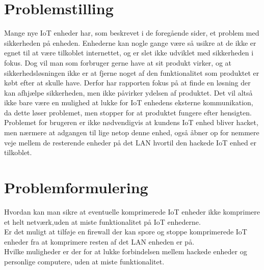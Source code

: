 \section{Problemstilling}


Mange nye IoT enheder har, som beskrevet i de foregående sider, et problem med sikkerheden på enheden. Enhederne kan nogle gange være så usikre at de ikke er egnet til at være tilkoblet internettet, og er slet ikke udviklet med sikkerheden i fokus. Dog vil man som forbruger gerne have at sit produkt virker, og at sikkerhedsløsningen ikke er at fjerne noget af den funktionalitet som produktet er købt efter at skulle have. Derfor har rapporten fokus på at finde en løsning der kan afhjælpe sikkerheden, men ikke påvirker ydelsen af produktet. Det vil altså ikke bare være en mulighed at lukke for IoT enhedens eksterne kommunikation, da dette løser problemet, men stopper for at produktet fungere efter hensigten.\\
Problemet for brugeren er ikke nødvendigvis at kundens IoT enhed bliver hacket, men nærmere at adgangen til lige netop denne enhed, også åbner op for nemmere veje mellem de resterende enheder på det LAN hvortil den hackede IoT enhed er tilkoblet.

\section{Problemformulering}

Hvordan kan man sikre at eventuelle komprimerede IoT enheder ikke komprimere et helt netværk,uden at miste funktionalitet på IoT enhederne.\\
Er det muligt at tilføje en firewall der kan spore og stoppe komprimerede IoT enheder fra at komprimere resten af det LAN enheden er på.\\
Hvilke muligheder er der for at lukke forbindelsen mellem hackede enheder og personlige computere, uden at miste funktionalitet.\\

